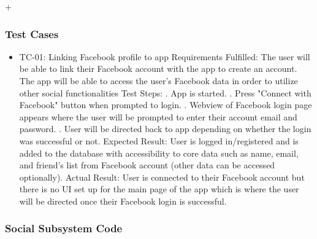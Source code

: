 ﻿\documentclass{article}
\begin{document}
+\subsubsection{Test Cases}
\begin{itemize}
  \item TC-01: Linking Facebook profile to app
  \subitem Requirements Fulfilled:
  \subsubitem The user will be able to link their Facebook account with the app to create
  an account.
  \subsubitem The app will be able to access the user's Facebook data in order to utilize other social functionalities
  \subitem Test Steps:
  . App is started.
  . Press "Connect with Facebook" button when prompted to login.
  . Webview of Facebook login page appears where the user will be prompted to enter their account email and password.
  . User will be directed back to app depending on whether the login was successful or not.
  \subitem Expected Result: User is logged in/registered and is added to the database with accessibility to core data such as name, email, and friend's list from Facebook account (other data can be accessed optionally).
  \subitem Actual Result: User is connected to their Facebook account but there is no UI set up for the main page of the app which is where the user will be directed once their Facebook login is successful.
\end{itemize}
\pagebreak

\subsubsection{Social Subsystem Code}
\end{document}

